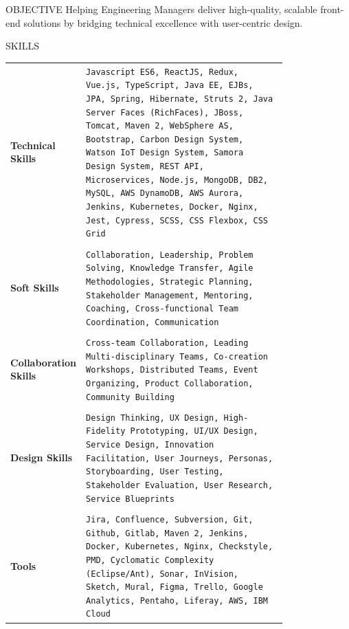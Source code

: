 \documentclass{resume} %
\begin{document}

\begin{rSection}{OBJECTIVE}
Helping Engineering Managers deliver high-quality, scalable front-end
solutions by bridging technical excellence with user-centric design.
\end{rSection}

\begin{rSection}{SKILLS}

\begin{tabular}{@{}>{\bfseries} l @{\hspace{6ex}}>{\raggedright\arraybackslash}p{0.8\linewidth}}
\textbf{Technical Skills} & \texttt{Javascript ES6, ReactJS, Redux, Vue.js, TypeScript, Java EE, EJBs, JPA, Spring, Hibernate, Struts 2, Java Server Faces (RichFaces), JBoss, Tomcat, Maven 2, WebSphere AS,   Bootstrap, Carbon Design System, Watson IoT Design System, Samora Design System, REST API, Microservices, Node.js, MongoDB, DB2, MySQL, AWS DynamoDB, AWS Aurora, Jenkins, Kubernetes, Docker, Nginx, Jest, Cypress, SCSS, CSS Flexbox, CSS Grid} \\ \\
\textbf{Soft Skills} & \texttt{Collaboration, Leadership, Problem Solving, Knowledge Transfer, Agile Methodologies, Strategic Planning, Stakeholder Management, Mentoring, Coaching, Cross-functional Team Coordination, Communication} \\ \\
\textbf{Collaboration Skills} & \texttt{Cross-team Collaboration, Leading Multi-disciplinary Teams, Co-creation Workshops, Distributed Teams, Event Organizing, Product Collaboration, Community Building} \\ \\
\textbf{Design Skills} & \texttt{Design Thinking, UX Design, High-Fidelity Prototyping, UI/UX Design, Service Design, Innovation Facilitation, User Journeys, Personas, Storyboarding, User Testing, Stakeholder Evaluation, User Research, Service Blueprints} \\ \\
\textbf{Tools} & \texttt{Jira, Confluence, Subversion, Git, Github, Gitlab, Maven 2, Jenkins, Docker, Kubernetes, Nginx, Checkstyle, PMD, Cyclomatic Complexity (Eclipse/Ant), Sonar, InVision, Sketch, Mural, Figma, Trello, Google Analytics, Pentaho, Liferay, AWS, IBM Cloud} \\


\end{tabular}

\end{rSection}
\end{document}
